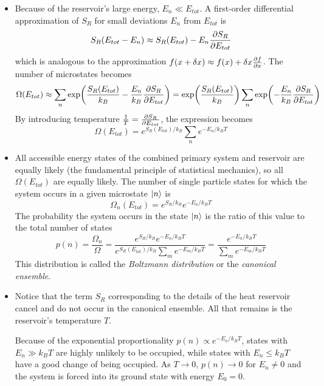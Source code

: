 \documentclass[11pt, a4paper]{article}
\begin{document}
\begin{itemize}
	\item Because of the reservoir's large energy, $ E_{n} \ll E_{tot}$. A first-order differential approximation of $ S_{R} $ for small deviations $ E_{n} $ from $ E_{tot} $ is
	\begin{equation*}
		S_{R}(E_{tot} - E_{n}) \approx S_{R}(E_{tot}) - E_{n}\pdv{S_{R}}{E_{tot}}
	\end{equation*}
	which is analogous to the approximation $ f(x + \delta x) \approx f(x) + \delta x \pdv{f}{x} $. The number of microstates becomes
	\begin{equation*}
		\Omega(E_{tot}) \approx \sum_{n} \exp(\frac{S_{R}(E_{tot}) }{k_{B}} - \frac{E_{n}}{k_{B}}\pdv{S_{R}}{E_{tot}}) = \exp(\frac{S_{R}(E_{tot})}{k_{B}}) \sum_{n} \exp(- \frac{E_{n}}{k_{B}}\pdv{S_{R}}{E_{tot}})
	\end{equation*}
	By introducing temperature $ \frac{1}{T} = \pdv{S_{R}}{E_{tot}} $, the expression becomes
	\begin{equation*}
		\Omega(E_{tot}) = e^{S_{R}(E_{tot})/k_{B}} \sum_{n} e^{-E_{n}/k_{B}T}
	\end{equation*}
		
	\item All accessible energy states of the combined primary system and reservoir are equally likely (the fundamental principle of statistical mechanics), so all $ \Omega(E_{tot}) $ are equally likely. The number of single particle states for which the system occurs in a given microstate $ \ket{n} $ is
	\begin{equation*}
		\Omega_{n}(E_{tot}) = e^{S_{R}/k_{B}} e^{-E_{n}/k_{B}T}
	\end{equation*}
	The probability the system occurs in the state $ \ket{n} $ is the ratio of this value to the total number of states
	\begin{equation*}
		p(n) = \frac{\Omega_{n}}{\Omega} = \frac{e^{S_{R}/k_{B}} e^{-E_{n}/k_{B}T}}{e^{S_{R}(E_{tot})/k_{B}} \sum_{m} e^{-E_{m}/k_{B}T}} = \frac{ e^{-E_{n}/k_{B}T}}{\sum_{m} e^{-E_{m}/k_{B}T}}
	\end{equation*}
	This distribution is called the \textit{Boltzmann distribution} or the \textit{canonical ensemble}. 
	
	\item Notice that the term $ S_{R} $ corresponding to the details of the heat reservoir cancel and do not occur in the canonical ensemble. All that remains is the reservoir's temperature $ T $.
	
	Because of the exponential proportionality $ p(n) \propto  e^{-E_{n}/k_{B}T} $, states with $ E_{n} \gg k_{B}T $ are highly unlikely to be occupied, while states with $ E_{n} \leq k_{B}T $ have a good change of being occupied. As $ T \to 0 $, $ p(n) \to 0 $ for $ E_{n} \neq 0 $ and the system is forced into its ground state with energy $ E_{0} = 0$.
	
\end{itemize}
\end{document}
